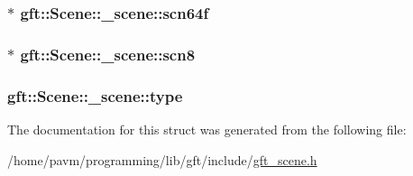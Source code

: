 \hypertarget{structgft_1_1Scene_1_1__scene_a7a635c7c4abf82e0fe0740510c54b775}{
\subsubsection[{scn64f}]{$\ast$ gft\-::\-Scene\-::\-\_\-scene\-::scn64f}}\label{structgft_1_1Scene_1_1__scene_a7a635c7c4abf82e0fe0740510c54b775}
\hypertarget{structgft_1_1Scene_1_1__scene_a8fe4664ea98a23e82a062375e72ec42e}{
\subsubsection[{scn8}]{$\ast$ gft\-::\-Scene\-::\-\_\-scene\-::scn8}}\label{structgft_1_1Scene_1_1__scene_a8fe4664ea98a23e82a062375e72ec42e}
\hypertarget{structgft_1_1Scene_1_1__scene_a40b5c581b52b256d8a2fce38b3bfca99}{
\subsubsection[{type}]{ gft\-::\-Scene\-::\-\_\-scene\-::type}}\label{structgft_1_1Scene_1_1__scene_a40b5c581b52b256d8a2fce38b3bfca99}


The documentation for this struct was generated from the following file\-:\begin{DoxyCompactItemize}
\item 
/home/pavm/programming/lib/gft/include/\hyperlink{gft__scene_8h}{gft\-\_\-scene.\-h}\end{DoxyCompactItemize}

